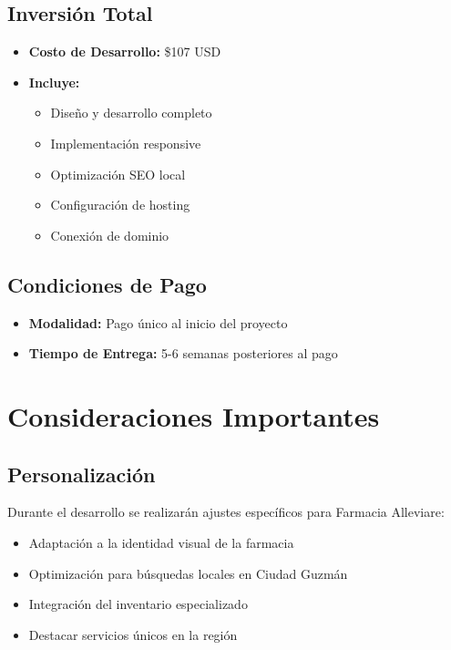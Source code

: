 \documentclass[12pt,a4paper]{article}
\begin{document}
\subsection{Inversión Total}
\begin{itemize}
    \item \textbf{Costo de Desarrollo:} \$107 USD
    \item \textbf{Incluye:}
    \begin{itemize}
        \item Diseño y desarrollo completo
        \item Implementación responsive
        \item Optimización SEO local
        \item Configuración de hosting
        \item Conexión de dominio
    \end{itemize}
\end{itemize}

\subsection{Condiciones de Pago}
\begin{itemize}
    \item \textbf{Modalidad:} Pago único al inicio del proyecto
    \item \textbf{Tiempo de Entrega:} 5-6 semanas posteriores al pago
\end{itemize}

\section{Consideraciones Importantes}

\subsection{Personalización}
Durante el desarrollo se realizarán ajustes específicos para Farmacia Alleviare:

\begin{itemize}
    \item Adaptación a la identidad visual de la farmacia
    \item Optimización para búsquedas locales en Ciudad Guzmán
    \item Integración del inventario especializado
    \item Destacar servicios únicos en la región
\end{itemize}
\end{document}
